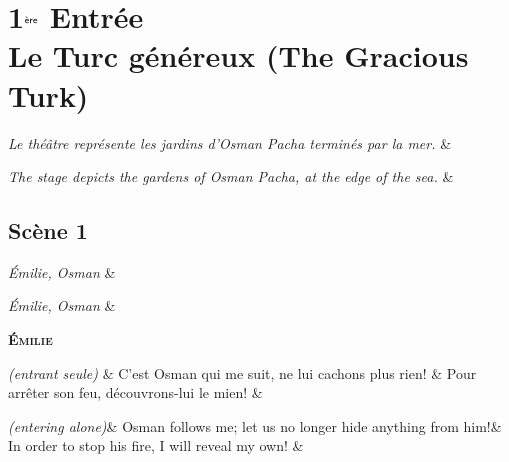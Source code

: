 \documentclass{article}
\newcommand{\accentcolr}{\color{WildStrawberry}}
\newcommand{\spotcolr}[1]{{\accentcolr#1}}
\newcommand{\secheadr}[1]{\rhead{\parbox{\marginparwidth}{\sffamily\spotcolr{#1}}}\cfoot{\thepage\hspace{\marginparwidth}\hspace{\marginparsep}}\thispagestyle{plain}}
\newcommand{\dialogue}[1]{%
    \filbreak\begin{center}
	    \textbf{\textsc{#1}}
    \end{center}\nopagebreak}
\newcommand{\stage}[1]{\hfill\emph{(#1)}\hfill}
\newcommand{\scene}[1]{\emph{#1}\hfill}
\begin{document}
\newpage

\section*{1$^{\textrm{\sffamily\`{e}re}}$ Entr\'{e}e \\ Le Turc g\'{e}n\'{e}reux (The Gracious Turk)}\secheadr{Act 1}

\begin{pairs}
\begin{Leftside}
	\stanza
		\scene{Le th\'{e}\^{a}tre repr\'{e}sente les jardins d'Osman Pacha termin\'{e}s par la mer.}
	\& 
	\endnumbering
\end{Leftside}
\begin{Rightside}
	\stanza
		\scene{The stage depicts the gardens of Osman Pacha, at the edge of the sea.}
	\&
	\endnumbering
\end{Rightside} 
\Columns 
\end{pairs}

\subsection*{Sc\`{e}ne 1}

\begin{pairs}
\begin{Leftside}
	\stanza
		\scene{\'{E}milie, Osman}
	\& 
	\endnumbering
\end{Leftside}
\begin{Rightside}
	\stanza
		\scene{\'{E}milie, Osman}
	\&
	\endnumbering
\end{Rightside} 
\Columns 
\end{pairs}

\dialogue{\'{E}milie}
\begin{pairs}
\begin{Leftside}
	\stanza
		\stage{entrant seule} &
		C'est Osman qui me suit, ne lui cachons plus rien! &
		Pour arr\^{e}ter son feu, d\'{e}couvrons-lui le mien!
    \& 
    \endnumbering
\end{Leftside}
\begin{Rightside}
	\stanza
		\stage{entering alone}&
		Osman follows me; let us no longer hide anything from him!&
		In order to stop his fire, I will reveal my own!
    \& 
    \endnumbering
\end{Rightside} 
\Columns 
\end{pairs}
\end{document}
